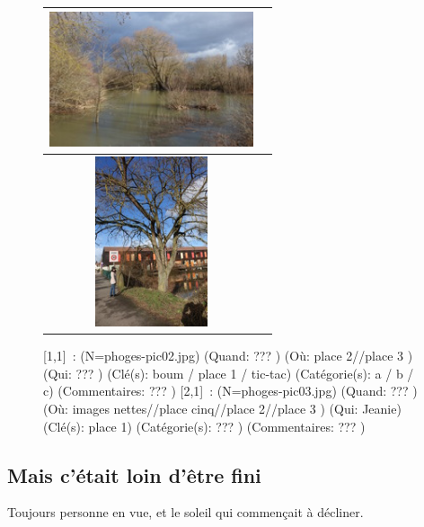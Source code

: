 \documentclass[12pt,twocolumn,french]{article}
\begin{document}
  \begin{figure}[H]
    \caption{
      [1,1]~: 
       (N=phoges-pic02.jpg)
       (Quand: ??? )
       (Où:  place 2//place 3 )
       (Qui: ??? )
       (Clé(s): boum / place 1 / tic-tac)
       (Catégorie(s): a / b / c)
       (Commentaires: ??? )
      [2,1]~: 
       (N=phoges-pic03.jpg)
       (Quand: ??? )
       (Où:  images nettes//place cinq//place 2//place 3 )
       (Qui: Jeanie)
       (Clé(s): place 1)
       (Catégorie(s): ??? )
       (Commentaires: ??? )
    }
    \vspace{4mm}
    \label{phoges-pic02.jpg}
    \noindent \centering{}
    \begin{tabular}{|c|c|}
      \hline
          \includegraphics[origin=c,angle=0,width=6cm ]{phoges-pic02.jpg}
        \tabularnewline \hline
          \includegraphics[origin=c,angle=-90,width=6cm ,height=5cm]{phoges-pic03.jpg}
        \tabularnewline \hline
    \end{tabular}
  \end{figure}
%
\subsection{ Mais c'était loin d'être fini}
%

 Toujours personne en vue, et le soleil qui commençait à décliner. 
\end{document}
